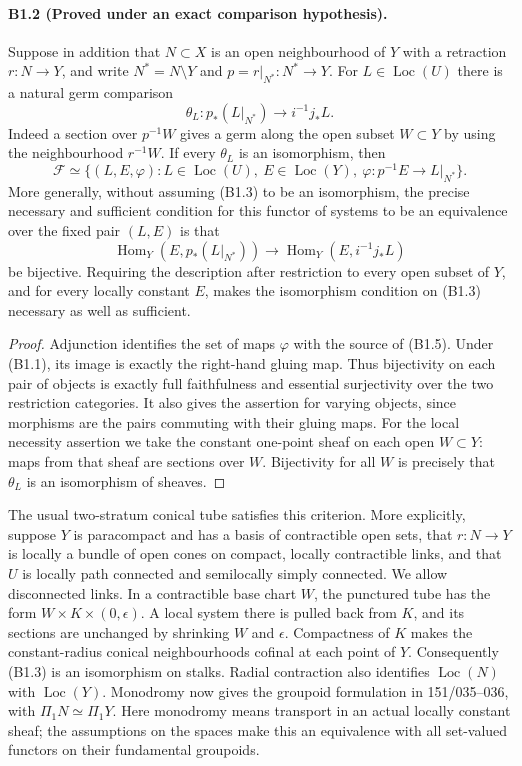 \paragraph{B1.2 (Proved under an exact comparison hypothesis).}
Suppose in addition that $N\subset X$ is an open neighbourhood of $Y$ with
a retraction $r:N\to Y$, and write $N^*=N\setminus Y$ and
$p=r|_{N^*}:N^*\to Y$. For $L\in\operatorname{Loc}(U)$ there is a natural
germ comparison
\[
 \theta_L:p_*(L|_{N^*})\longrightarrow i^{-1}j_*L.
 \tag{B1.3}
\]
Indeed a section over $p^{-1}W$ gives a germ along the open subset
$W\subset Y$ by using the neighbourhood $r^{-1}W$.
If every $\theta_L$ is an isomorphism, then
\[
 \mathcal F\simeq
 \{(L,E,\varphi):L\in\operatorname{Loc}(U),\ E\in\operatorname{Loc}(Y),\
       \varphi:p^{-1}E\longrightarrow L|_{N^*}\}.
 \tag{B1.4}
\]
More generally, without assuming (B1.3) to be an isomorphism, the precise
necessary and sufficient condition for this functor of systems to be an
equivalence over the fixed pair $(L,E)$ is that
\[
 \operatorname{Hom}_Y(E,p_*(L|_{N^*}))\longrightarrow
 \operatorname{Hom}_Y(E,i^{-1}j_*L)
 \tag{B1.5}
\]
be bijective. Requiring the description after restriction to every open
subset of $Y$, and for every locally constant $E$, makes the isomorphism
condition on (B1.3) necessary as well as sufficient.

\begin{proof}
Adjunction identifies the set of maps $\varphi$ with the source of
(B1.5). Under (B1.1), its image is exactly the right-hand gluing map.
Thus bijectivity on each pair of objects is exactly full faithfulness
and essential surjectivity over the two restriction categories. It also
gives the assertion for varying objects, since morphisms are the pairs
commuting with their gluing maps. For the local necessity assertion we
take the constant one-point sheaf on each open $W\subset Y$: maps from
that sheaf are sections over $W$. Bijectivity for all $W$ is precisely
that $\theta_L$ is an isomorphism of sheaves.
\end{proof}

The usual two-stratum conical tube satisfies this criterion. More
explicitly, suppose $Y$ is paracompact and has a basis of contractible
open sets, that
$r:N\to Y$ is locally a bundle of open cones on compact, locally
contractible links, and that $U$ is locally path connected and semilocally
simply connected. We allow disconnected links. In a contractible base
chart $W$, the punctured tube has the form
$W\times K\times(0,\epsilon)$. A local system there is pulled back from
$K$, and its sections are unchanged by shrinking $W$ and $\epsilon$.
Compactness of $K$ makes the constant-radius conical neighbourhoods
cofinal at each point of $Y$. Consequently (B1.3) is an isomorphism on
stalks. Radial contraction also identifies
$\operatorname{Loc}(N)$ with $\operatorname{Loc}(Y)$. Monodromy now gives
the groupoid formulation in 151/035--036, with
$\Pi_1N\simeq\Pi_1Y$. Here monodromy means transport in an actual
locally constant sheaf; the assumptions on the spaces make this an
equivalence with all set-valued functors on their fundamental groupoids.

